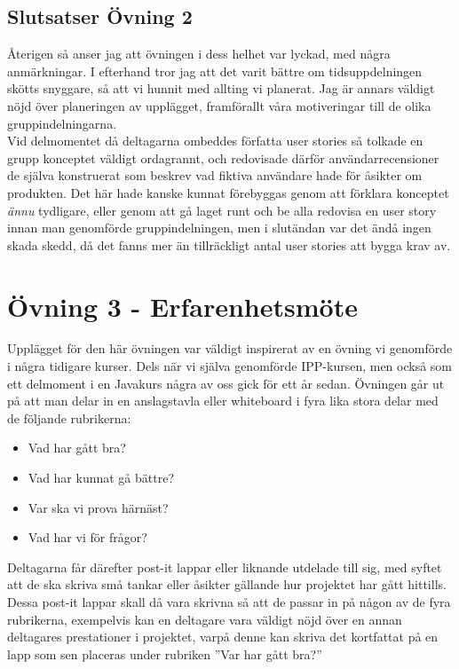 \documentclass[a4paper, titlepage,12pt]{article}
\begin{document}
			\subsection{Slutsatser Övning 2}

				Återigen så anser jag att övningen i dess helhet var lyckad, med några anmärkningar. I efterhand tror jag att det varit bättre om tidsuppdelningen skötts snyggare, så att vi hunnit med allting vi planerat. Jag är annars väldigt nöjd över planeringen av upplägget, framförallt våra motiveringar till de olika gruppindelningarna.\\

				Vid delmomentet då deltagarna ombeddes författa user stories så tolkade en grupp konceptet väldigt ordagrannt, och redovisade därför användarrecensioner de själva konstruerat som beskrev vad fiktiva användare hade för åsikter om produkten. Det här hade kanske kunnat förebyggas genom att förklara konceptet \emph{ännu} tydligare, eller genom att gå laget runt och be alla redovisa en user story innan man genomförde gruppindelningen, men i slutändan var det ändå ingen skada skedd, då det fanns mer än tillräckligt antal user stories att bygga krav av.

	\section{Övning 3 - Erfarenhetsmöte}

			Upplägget för den här övningen var väldigt inspirerat av en övning vi genomförde i några tidigare kurser. Dels när vi själva genomförde IPP-kursen, men också som ett delmoment i en Javakurs några av oss gick för ett år sedan. Övningen går ut på att man delar in en anslagstavla eller whiteboard i fyra lika stora delar med de följande rubrikerna:
			\begin{itemize}
				\item Vad har gått bra?
				\item Vad har kunnat gå bättre?
				\item Var ska vi prova härnäst?
				\item Vad har vi för frågor?
			\end{itemize}

			Deltagarna får därefter post-it lappar eller liknande utdelade till sig, med syftet att de ska skriva små tankar eller åsikter gällande hur projektet har gått hittills. Dessa post-it lappar skall då vara skrivna så att de passar in på någon av de fyra rubrikerna, exempelvis kan en deltagare vara väldigt nöjd över en annan deltagares prestationer i projektet, varpå denne kan skriva det kortfattat på en lapp som sen placeras under rubriken ''Var har gått bra?'' 
\end{document}
